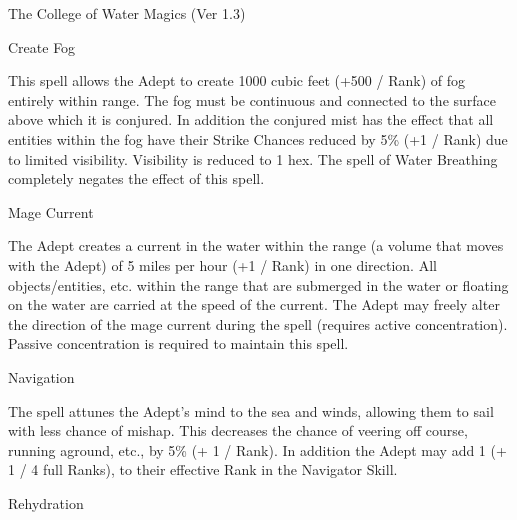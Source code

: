 \begin{Chapter}{The College of Water Magics (Ver 1.3)}
\begin{spell}[G-3]{Create Fog}
\begin{effects}
This spell allows the Adept to create 1000 cubic feet (+500 / Rank) of
fog entirely within range.  The fog must be continuous and connected
to the surface above which it is conjured.  In addition the conjured
mist has the effect that all entities within the fog have their Strike
Chances reduced by 5\% (+1 / Rank) due to limited visibility.
Visibility is reduced to 1 hex.  The spell of Water Breathing
completely negates the effect of this spell.
\end{effects}
\end{spell}

\begin{spell}[G-4]{Mage Current}
\begin{effects}
The Adept creates a current in the water within the range (a volume
that moves with the Adept) of 5 miles per hour (+1 / Rank) in one
direction. All objects/entities, etc. within the range that are
submerged in the water or floating on the water are carried at the
speed of the current.  The Adept may freely alter the direction of the
mage current during the spell (requires active concentration). Passive
concentration is required to maintain this spell.
\end{effects}
\end{spell}

\begin{spell}[G-5]{Navigation}

\begin{effects}
The spell attunes the Adept’s mind to the sea and winds, allowing them
to sail with less chance of mishap.  This decreases the chance of
veering off course, running aground, etc., by 5\% (+ 1 / Rank). In
addition the Adept may add 1 (+ 1 / 4 full Ranks), to their effective
Rank in the Navigator Skill.
\end{effects}
\end{spell}

\begin{spell}[G-6]{Rehydration}


\end{spell}
\end{Chapter}
